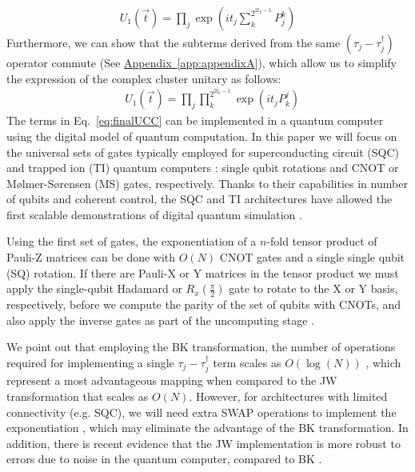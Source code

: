\documentclass[superscriptaddress,aps,pra,twocolumn,nofootinbib,babel]{revtex4-1}
\newcommand{\app}[1]{\hyperref[app:#1]{Appendix~\ref*{app:#1}}}
\newcommand{\fig}[1]{\hyperref[fig:#1]{Figure~\ref*{fig:#1}}}
\newcommand{\ch}[1]{{\color{orange}{#1}}}
\begin{document}
\begin{align}
U_{1}\left(\vec{t}\right)=\prod_j \exp \left(i t_j \sum^{2^{2l_k-1}}_k P^k_j \right)
\end{align}
Furthermore, we can show that the subterms derived from the same $(\tau_j-\tau_j^{\dagger})$ operator commute (See \app{appendixA}), which allow us to simplify the expression of the complex cluster unitary as follows:
\begin{align}\label{eq:finalUCC}
&U_{1}\left(\vec{t}\right)=\prod_j \prod^{2^{2l_k-1}}_k \exp(i t_j P^j_k )
\end{align}
The terms in Eq.~\ref{eq:finalUCC} can be implemented in a quantum computer using the digital model of quantum computation. In this paper we will focus on the universal sets of gates typically employed for superconducting circuit (SQC) and trapped ion (TI) quantum computers \cite{Benhelm.NP.4.463.2008,Barends.N.508.500.2014}: single qubit rotations and CNOT or M{\o}lmer-S{\o}rensen (MS) gates, respectively. %
Thanks to their capabilities in number of qubits and coherent control, the SQC and TI architectures have allowed the first scalable demonstrations of digital quantum simulation \cite{Lanyon.S.334.57.2011,Blatt.NP.8.277.2012,Barends.NC.6.7654.2015}.

Using the first set of gates, the exponentiation of a $n$-fold tensor product of Pauli-Z matrices can be done with $O(N)$ CNOT gates and a single single qubit (SQ) rotation. If there are Pauli-X or Y matrices in the tensor product we must apply the single-qubit Hadamard or $R_x(\frac{\pi}{2})$ gate to rotate to the X or Y basis, respectively, before we compute the parity of the set of qubits with CNOTs, and also apply the inverse gates as part of the uncomputing stage \cite{Whitfield.MP.109.735.2011,Seeley.JCP.137.224109.2012,Tranter.115.1431.IJQC.2015}.

We point out that employing the BK transformation, the number of operations required for implementing a single $\tau_j-\tau_j^{\dagger}$ term scales as $O(\log(N))$ \cite{Seeley.JCP.137.224109.2012}, which represent a most advantageous mapping when compared to the JW transformation that scales as $O(N)$. However, for architectures with limited connectivity (e.g. SQC), we will need extra SWAP operations to implement the exponentiation%
, which may eliminate the advantage of the BK transformation. In addition, there is recent evidence that the JW implementation is more robust to errors due to noise in the quantum computer, compared to BK \cite{sawaya2016error}.
\end{document}
